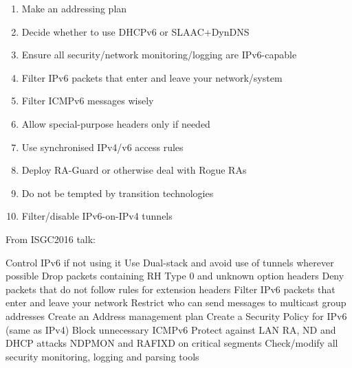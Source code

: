 




\begin{enumerate}


\item Make an addressing plan


\item Decide whether to use DHCPv6 or SLAAC+DynDNS


\item Ensure all security/network monitoring/logging are IPv6-capable



\item Filter IPv6 packets that enter and leave your network/system

\item Filter ICMPv6 messages wisely

\item Allow special-purpose headers only if needed

\item Use synchronised IPv4/v6 access rules



\item Deploy RA-Guard or otherwise deal with Rogue RAs



\item Do not be tempted by transition technologies

\item Filter/disable IPv6-on-IPv4 tunnels



\end{enumerate}

From ISGC2016 talk:

Control IPv6 if not using it
Use Dual-stack and avoid use of tunnels wherever possible
Drop packets containing RH Type 0 and unknown option headers
Deny packets that do not follow rules for extension headers
Filter IPv6 packets that enter and leave your network
Restrict who can send messages to multicast group addresses
Create an Address management plan
Create a Security Policy for IPv6 (same as IPv4)
Block unnecessary ICMPv6
Protect against LAN RA, ND and DHCP attacks
NDPMON and RAFIXD on critical segments
Check/modify all security monitoring, logging and parsing tools



